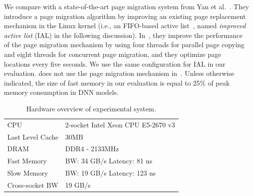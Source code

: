 We compare \name with a state-of-the-art page migration system from Yan et al.~\cite{Yan:ASPLOS19}. They introduce a page migration algorithm by improving an existing page replacement mechanism in the Linux kernel (i.e., an FIFO-based active list~\cite{Yan:ASPLOS19}, named \textit{improved active list} (IAL) in the following discussion). In~\cite{Yan:ASPLOS19}, they improve the performance of the page migration mechanism by using four threads for parallel page copying and eight threads for concurrent page migration, and they optimize page locations every five seconds. \textcolor{check}{We use the same configuration for IAL in our evaluation}. \name does not use the page migration mechanism in~\cite{Yan:ASPLOS19}. Unless otherwise indicated, \textcolor{check}{the size of fast memory in our evaluation is equal to 25\% of peak memory consumption in DNN models.}


\begin{table}[tbp]
\centering
\small
\vspace{-5pt}
\caption{Hardware overview of experimental system.}
\vspace{-5pt}
\begin{spacing}{0.9}
\begin{tabular}{ll}
\hline
CPU& 2-socket Intel Xeon CPU E5-2670 v3 \\ %
\textcolor{check}{Last Level Cache} & 30MB \\
DRAM& DDR4 - 2133MHz   \\
Fast Memory & BW: 34 GB/s  \phantom{L}  Latency: 81 ns \\ %
Slow Memory& BW: 19 GB/s  \phantom{L}  Latency: 123 ns\\
Cross-socket BW & 19 GB/s\\ 
\hline
\end{tabular}
\end{spacing}
\vspace{-5pt}
\label{tab:hardware}
\end{table}



